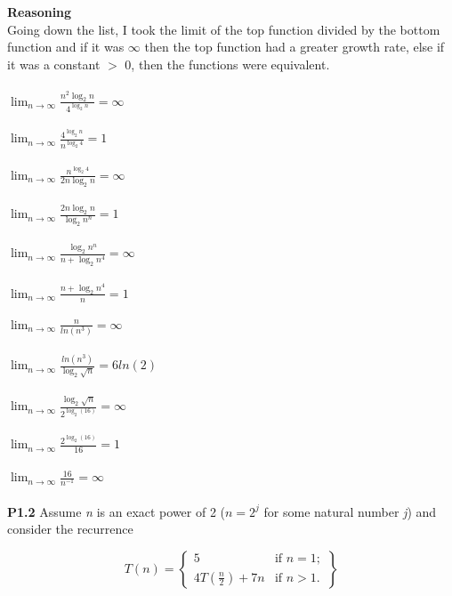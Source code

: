 \documentclass{article}
\begin{document}
\noindent \textbf{Reasoning}\\
Going down the list, I took the limit of the top function divided by the bottom function and if it was $\infty$ then the top function had a greater growth rate, else if it was a constant $>$ 0, then the functions were equivalent.\\\\
\large $\lim_{n \to \infty} \frac{n^2\log _{2} n}{4^{\log _{2} n}} = \infty$\\\\
$\lim_{n \to \infty} \frac{4^{\log _{2} n}}{n^{\log _2 4}} = 1$\\\\
$\lim_{n \to \infty} \frac{n^{\log _2 4}}{2n\log _2 n} = \infty$\\\\
$\lim_{n \to \infty} \frac{2n\log _2 n}{\log _2 n^n} = 1$\\\\
$\lim_{n \to \infty} \frac{\log _2 n^n}{n+ \log _2 n^4} = \infty$\\\\
$\lim_{n \to \infty} \frac{n+ \log _2 n^4 }{n} = 1$\\\\
$\lim_{n \to \infty} \frac{n}{ln(n^3)} = \infty$\\\\
$\lim_{n \to \infty} \frac{ln(n^3)}{\log _2 \sqrt{n}} = 6ln(2)$\\\\
$\lim_{n \to \infty} \frac{\log _2 \sqrt{n}}{2^{\log _2(16)}} = \infty$\\\\
$\lim_{n \to \infty} \frac{2^{\log _2(16)}}{16} = 1$\\\\
$\lim_{n \to \infty} \frac{16}{n^{-1}} = \infty$\\\\

\normalsize
\vspace{10pt} \noindent
\textbf {P1.2} Assume \textit{n} is an exact power of 2 ($n = 2^j$ for some natural number \textit{j}) and consider the recurrence

\begin{equation}
T(n) = 
\left\{
    \begin{array}{lr}
        5 & \text{if } n = 1;\\
        4T(\frac{n}{2}) + 7n & \text{if } n > 1.
    \end{array}
\right\}
\end{equation}
\end{document}
